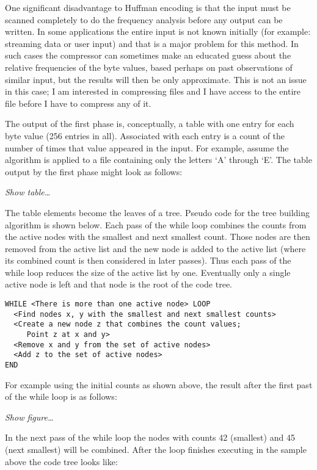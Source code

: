 One significant disadvantage to Huffman encoding is that the input must be scanned completely to
do the frequency analysis before any output can be written. In some applications the entire
input is not known initially (for example: streaming data or user input) and that is a major
problem for this method. In such cases the compressor can sometimes make an educated guess about
the relative frequencies of the byte values, based perhaps on past observations of similar
input, but the results will then be only approximate. This is not an issue in this case; I am
interested in compressing files and I have access to the entire file before I have to compress
any of it.

The output of the first phase is, conceptually, a table with one entry for each byte value (256
entries in all). Associated with each entry is a count of the number of times that value
appeared in the input. For example, assume the algorithm is applied to a file containing only
the letters `A' through `E'. The table output by the first phase might look as follows:

\textit{Show table\ldots}

The table elements become the leaves of a tree. Pseudo code for the tree building algorithm is
shown below. Each pass of the while loop combines the counts from the active nodes with the
smallest and next smallest count. Those nodes are then removed from the active list and the new
node is added to the active list (where its combined count is then considered in later passes).
Thus each pass of the while loop reduces the size of the active list by one. Eventually only a
single active node is left and that node is the root of the code tree.

\begin{Verbatim}
WHILE <There is more than one active node> LOOP
  <Find nodes x, y with the smallest and next smallest counts>
  <Create a new node z that combines the count values;
     Point z at x and y>
  <Remove x and y from the set of active nodes>
  <Add z to the set of active nodes>
END
\end{Verbatim}

For example using the initial counts as shown above, the result after the first past of the
while loop is as follows:

\textit{Show figure\ldots}

In the next pass of the while loop the nodes with counts 42 (smallest) and 45 (next smallest)
will be combined. After the loop finishes executing in the sample above the code tree looks
like:

